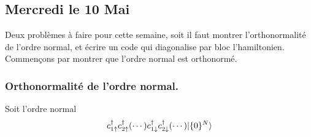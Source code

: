 \documentclass{subfiles}[../main.tex]
\begin{document}



        \subsection{Mercredi le 10 Mai}
            Deux problèmes à faire pour cette semaine, soit il faut montrer
            l'orthonormalité de l'ordre normal, et écrire un code qui diagonalise
            par bloc l'hamiltonien. Commençons par montrer que l'ordre normal
            est orthonormé.
            \subsubsection{Orthonormalité de l'ordre normal.} %
            \label{sec:orthonormalité de l'ordre normal.}
                Soit l'ordre normal
                \begin{align}
                    c^\dagger_{1\uparrow}c^\dagger_{2\uparrow}(\cdots)
                    c^\dagger_{1\downarrow}c^\dagger_{2\downarrow}(\cdots)
                    |{\{0\}^N}\rangle
                \end{align}

\end{document}
